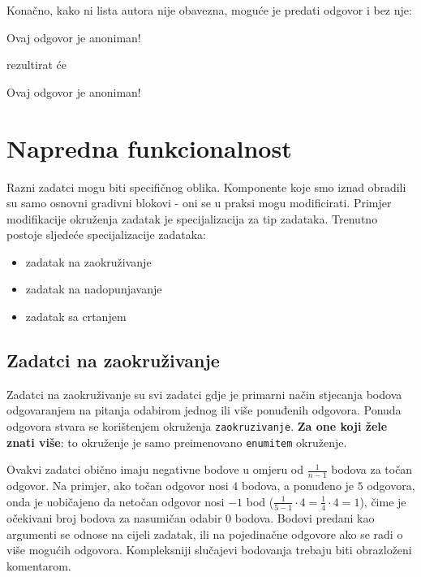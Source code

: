 \documentclass{studosi-workbook}
\begin{document}
	Konačno, kako ni lista autora nije obavezna, moguće je predati odgovor i bez nje:
	
	\begin{kod}
	\begin{odgovor}
		Ovaj odgovor je anoniman!
	\end{odgovor}
	\end{kod}
	
	rezultirat će
	
	\begin{odgovor}
		Ovaj odgovor je anoniman!
	\end{odgovor}

	\vspace*{15pt}


	\section{Napredna funkcionalnost}
	Razni zadatci mogu biti specifičnog oblika. Komponente koje smo iznad obradili su samo osnovni gradivni blokovi - oni se u praksi mogu modificirati. Primjer modifikacije okruženja zadatak je specijalizacija za tip zadataka. Trenutno postoje sljedeće specijalizacije zadataka:
	
	\begin{itemize}
		\item zadatak na zaokruživanje
		\item zadatak na nadopunjavanje
		\item zadatak sa crtanjem
	\end{itemize}

	\subsection{Zadatci na zaokruživanje}
	Zadatci na zaokruživanje su svi zadatci gdje je primarni način stjecanja bodova odgovaranjem na pitanja odabirom jednog ili više ponuđenih odgovora. Ponuda odgovora stvara se korištenjem okruženja \texttt{zaokruzivanje}. \textbf{Za one koji žele znati više}: to okruženje je samo preimenovano \texttt{enumitem} okruženje.
	
	Ovakvi zadatci obično imaju negativne bodove u omjeru od $\frac{1}{n-1}$ bodova za točan odgovor. Na primjer, ako točan odgovor nosi $4$ bodova, a ponuđeno je $5$ odgovora, onda je uobičajeno da netočan odgovor nosi $-1$ bod ($\frac{1}{5-1} \cdot 4 = \frac{1}{4} \cdot 4 = 1$), čime je očekivani broj bodova za nasumičan odabir $0$ bodova. Bodovi predani kao argumenti se odnose na cijeli zadatak, ili na pojedinačne odgovore ako se radi o više mogućih odgovora. Kompleksniji slučajevi bodovanja trebaju biti obrazloženi komentarom. \\
	
\end{document}
